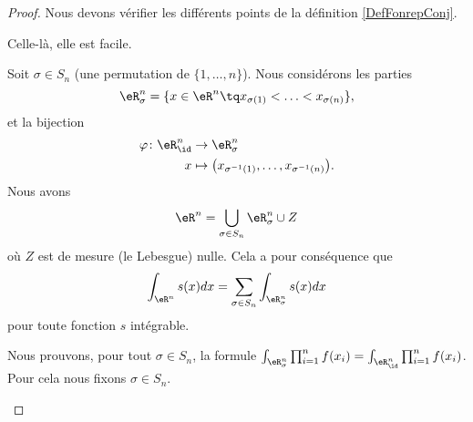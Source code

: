 \begin{proof}
	Nous devons vérifier les différents points de la définition \ref{DefFonrepConj}.
	\begin{subproof}
		\spitem[\( g\geq 0\)]
		Celle-là, elle est facile.

		Soit \( \sigma\in S_n\) (une permutation de \( \{ 1,\ldots,n \}\)). Nous considérons les parties
		\begin{equation}
			\eR^n_{\sigma}=\{ x\in \eR^n\tq x_{\sigma(1)}<\ldots <x_{\sigma(n)} \},
		\end{equation}
		et la bijection
		\begin{equation}
			\begin{aligned}
				\varphi\colon \eR_{\id}^n & \to \eR^n_{\sigma}                                                 \\
				x                         & \mapsto \big( x_{\sigma^{-1}(1)},\ldots, x_{\sigma^{-1}(n)} \big).
			\end{aligned}
		\end{equation}
		Nous avons
		\begin{equation}
			\eR^n=\bigcup_{\sigma\in S_{n}}\eR^n_{\sigma}\cup Z
		\end{equation}
		où \( Z\) est de mesure (le Lebesgue) nulle. Cela a pour conséquence que
		\begin{equation}		\label{EQooIEWWooZgORTM}
			\int_{\eR^n}s(x)dx=\sum_{\sigma\in S_n}\int_{\eR^n_{\sigma}}s(x)dx
		\end{equation}
		pour toute fonction \( s\) intégrable.

		Nous prouvons, pour tout \( \sigma\in S_n\), la formule \( \int_{\eR^n_{\sigma}}\prod_{i=1}^nf(x_i)=\int_{\eR^n_{\id}}\prod_{i=1}^nf(x_i)\). Pour cela nous fixons \( \sigma\in S_n\).


\end{subproof}
\end{proof}
